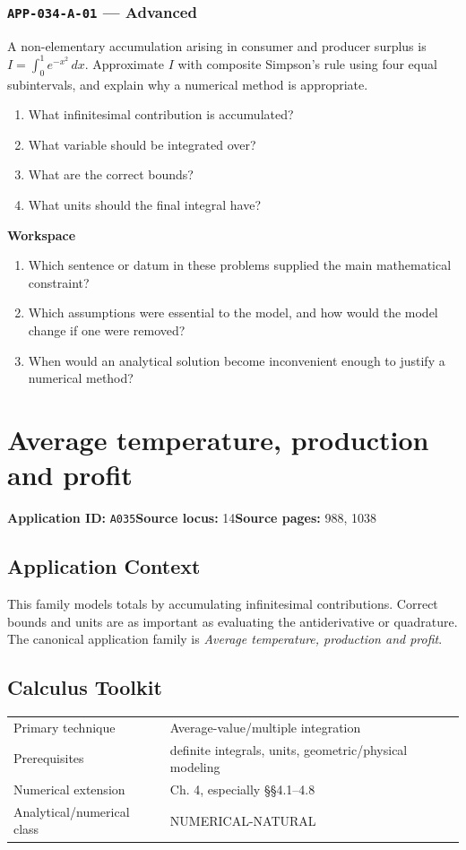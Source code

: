 \documentclass[11pt]{book}
\newcommand{\pid}[1]{\texttt{#1}}
\newcommand{\workspace}{\par\vspace{0.7in}\hrulefill\par\vspace{0.55in}\hrulefill\par}
\begin{document}
\subsection*{\pid{APP-034-A-01} — Advanced}
\begin{problembox}
A non-elementary accumulation arising in consumer and producer surplus is $I=\int_0^1 e^{-x^2}\,dx$. Approximate $I$ with composite Simpson's rule using four equal subintervals, and explain why a numerical method is appropriate.
\end{problembox}
\begin{promptbox}\begin{enumerate}
\item What infinitesimal contribution is accumulated?
\item What variable should be integrated over?
\item What are the correct bounds?
\item What units should the final integral have?
\end{enumerate}\end{promptbox}
\textbf{Workspace}\workspace
\begin{reflectionbox}\begin{enumerate}
\item Which sentence or datum in these problems supplied the main mathematical constraint?
\item Which assumptions were essential to the model, and how would the model change if one were removed?
\item When would an analytical solution become inconvenient enough to justify a numerical method?
\end{enumerate}\end{reflectionbox}
\chapter{Average temperature, production and profit}\label{app:A035}
\textbf{Application ID:} \pid{A035}\quad \textbf{Source locus:} 14\quad \textbf{Source pages:} 988, 1038
\section*{Application Context}
This family models totals by accumulating infinitesimal contributions. Correct bounds and units are as important as evaluating the antiderivative or quadrature. The canonical application family is \emph{Average temperature, production and profit}.
\section*{Calculus Toolkit}
\begin{tabularx}{\textwidth}{@{}lX@{}}\toprule
Primary technique & Average-value/multiple integration \\
Prerequisites & definite integrals, units, geometric/physical modeling \\
Numerical extension & Ch. 4, especially §§4.1–4.8 \\
Analytical/numerical class & NUMERICAL-NATURAL \\
\bottomrule\end{tabularx}
\end{document}
